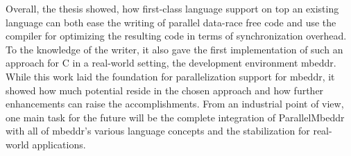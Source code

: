 Overall, the thesis showed, how first-class language support on top an existing language can both ease the writing of parallel data-race free code and use the compiler for optimizing the resulting code in terms of synchronization overhead. To the knowledge of the writer, it also gave the first implementation of such an approach for C in a real-world setting, the development environment mbeddr. While this work laid the foundation for parallelization support for mbeddr, it showed how much potential reside in the chosen approach and how further enhancements can raise the accomplishments. From an industrial point of view, one main task for the future will be the complete integration of ParallelMbeddr with all of mbeddr's various language concepts and the stabilization for real-world applications.
